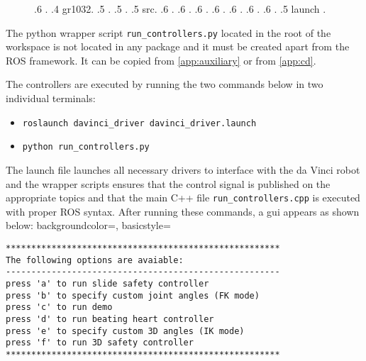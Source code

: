 \begin{figure}[H]
{.6 \color{ForestGreen}{p4\_hand\_controller.yaml}\hspace{0.2cm}\color{gray}{\# specify each controllable joint}.
.4 gr1032.
.5 \color{ForestGreen}{CMakeLists.txt}.
.5 \color{ForestGreen}{package.xml}.
.5 src.
.6 \color{ForestGreen}{run\_controller.cpp} \color{gray}{\# main C++ interface (controllers) }.
.6 \color{ForestGreen}{demo\_gr1032.cpp} \color{gray}{\# demo }.
.6 \color{ForestGreen}{demo\_gr1032.h} \color{gray}{\# associated .h file }.
.6 \color{ForestGreen}{ik\_gr1032.cpp} \color{gray}{\# inverse kinematic test script }.
.6 \color{ForestGreen}{ik\_gr1032.h} \color{gray}{\# associated .h file }.
.6 \color{ForestGreen}{safe\_3d.cpp} \color{gray}{\# safety controllers in 3D }.
.6 \color{ForestGreen}{safe\_3d.h} \color{gray}{\# associated .h file }.
.5 launch \color{gray}{\# not used}.
}
\end{figure}
The python wrapper script \texttt{run\_controllers.py} located in the root of the workspace is not located in any package and it must be created apart from the ROS framework. It can be copied from \autoref{app:auxiliary} or from \autoref{app:cd}.

The controllers are executed by running the two commands below in two individual terminals:
\begin{itemize}
\item \texttt{roslaunch davinci\_driver davinci\_driver.launch}
\item \texttt{python run\_controllers.py}
\end{itemize}
The launch file launches all necessary drivers to interface with the da Vinci robot and the wrapper scripts ensures that the control signal is published on the appropriate topics and that the main C++ file \texttt{run\_controllers.cpp} is executed with proper ROS syntax.
\newpage
After running these commands, a \gls{gui} appears as shown below:
{
    backgroundcolor=\color{white},
    basicstyle=\scriptsize\color{black}\ttfamily
}
\vspace{0.5cm}

\begin{lstlisting}[style=DOS]
******************************************************
The following options are avaiable:
------------------------------------------------------
press 'a' to run slide safety controller
press 'b' to specify custom joint angles (FK mode)
press 'c' to run demo
press 'd' to run beating heart controller
press 'e' to specify custom 3D angles (IK mode)
press 'f' to run 3D safety controller
******************************************************
\end{lstlisting}
\vspace{0.3cm}

